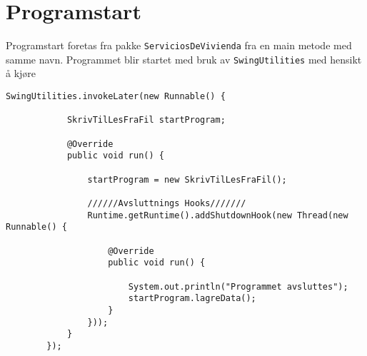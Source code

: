 \section{Programstart}
Programstart foretas fra pakke \texttt{ServiciosDeVivienda} fra en main metode med samme navn. Programmet blir startet med bruk av \texttt{SwingUtilities} med hensikt å kjøre 

\begin{lstlisting}[caption=Oppstart av programmet., label=kode:oppstart1]
        SwingUtilities.invokeLater(new Runnable() {

            SkrivTilLesFraFil startProgram;

            @Override
            public void run() {

                startProgram = new SkrivTilLesFraFil();

                //////Avsluttnings Hooks///////
                Runtime.getRuntime().addShutdownHook(new Thread(new Runnable() {

                    @Override
                    public void run() {

                        System.out.println("Programmet avsluttes");
                        startProgram.lagreData();
                    }
                }));
            }
        });
\end{lstlisting}